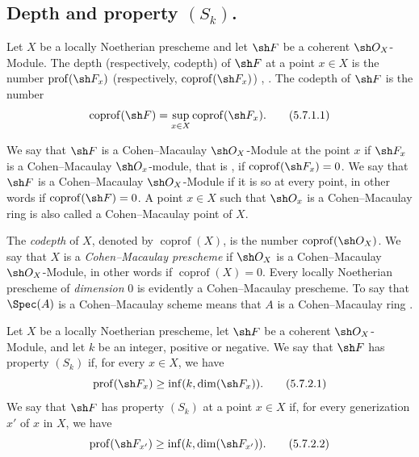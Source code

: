 \subsection{Depth and property \texorpdfstring{$(S_k)$.}{(Sk)}}
\label{subsection:IV.5.7}


\begin{definition}[5.7.1]
\label{IV.5.7.1}
Let $X$ be a locally Noetherian prescheme and let $\sh F$ be a
coherent $\sh O_X$-Module.  The depth \textup{(respectively,}
codepth\textup{)} of $\sh F$ at a point $x\in X$ is the number
$\operatorname{prof}(\sh F_x)$ \textup{(respectively,}
$\operatorname{coprof}(\sh F_x)$\textup{)}
, .  The codepth of
$\sh F$ is the number
\begin{equation}
\operatorname{coprof}(\sh F)
 =\sup_{x\in X}\operatorname{coprof}(\sh F_x).
\tag{5.7.1.1}\label{IV.5.7.1.1}
\end{equation}

We say that $\sh F$ is a Cohen--Macaulay $\sh O_X$-Module at the point
$x$ if $\sh F_x$ is a Cohen--Macaulay $\sh O_x$-module, that is
, if
$\operatorname{coprof}(\sh F_x)=0$.  We say that $\sh F$ is a
Cohen--Macaulay $\sh O_X$-Module if it is so at every point,
in other words if $\operatorname{coprof}(\sh F)=0$.  A point
$x\in X$ such that $\sh O_x$ is a Cohen--Macaulay ring is also
called a Cohen--Macaulay point of $X$.
\end{definition}

The \emph{codepth} of $X$, denoted by $\operatorname{coprof}(X)$,
is the number $\operatorname{coprof}(\sh O_X)$.  We say that $X$
is a \emph{Cohen--Macaulay prescheme} if $\sh O_X$ is a
Cohen--Macaulay $\sh O_X$-Module, in other words if
$\operatorname{coprof}(X)=0$.  Every locally Noetherian prescheme of
\emph{dimension} $0$ is evidently a Cohen--Macaulay prescheme.  To say that
$\Spec(A)$ is a Cohen--Macaulay scheme means that $A$ is a Cohen--Macaulay
ring .

\begin{definition}[5.7.2]
\label{IV.5.7.2}
Let $X$ be a locally Noetherian prescheme, let $\sh F$ be a coherent
$\sh O_X$-Module, and let $k$ be an integer, positive or negative.
We say that $\sh F$ has property $(S_k)$ if, for every
$x\in X$, we have
\begin{equation}
\operatorname{prof}(\sh F_x)
 \geq \inf(k,\dim(\sh F_x)).
\tag{5.7.2.1}\label{IV.5.7.2.1}
\end{equation}
We say that $\sh F$ has property $(S_k)$ at a point $x\in X$
if, for every generization $x'$ of $x$ in $X$, we have
\begin{equation}
\operatorname{prof}(\sh F_{x'})
 \geq \inf(k,\dim(\sh F_{x'})).
\tag{5.7.2.2}\label{IV.5.7.2.2}
\end{equation}
\end{definition}

